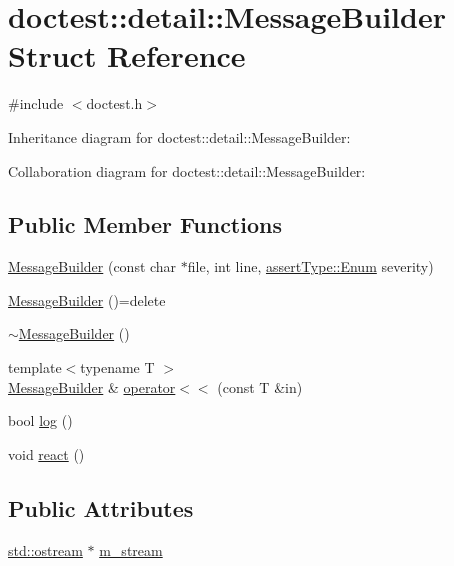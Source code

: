 \hypertarget{structdoctest_1_1detail_1_1MessageBuilder}{}\section{doctest\+:\+:detail\+:\+:Message\+Builder Struct Reference}
\label{structdoctest_1_1detail_1_1MessageBuilder}


{\ttfamily \#include $<$doctest.\+h$>$}



Inheritance diagram for doctest\+:\+:detail\+:\+:Message\+Builder\+:


Collaboration diagram for doctest\+:\+:detail\+:\+:Message\+Builder\+:
\subsection*{Public Member Functions}
\begin{DoxyCompactItemize}
\item 
\hyperlink{structdoctest_1_1detail_1_1MessageBuilder_a93cb6f180968d38cb0f18b08ec6c9000}{Message\+Builder} (const char $\ast$file, int line, \hyperlink{namespacedoctest_1_1assertType_ae1bb5bed722f34f1c38b83cb19d326d3}{assert\+Type\+::\+Enum} severity)
\item 
\hyperlink{structdoctest_1_1detail_1_1MessageBuilder_aaaaf33f49c6d66425af9c2306010ae7e}{Message\+Builder} ()=delete
\item 
\hyperlink{structdoctest_1_1detail_1_1MessageBuilder_aa8dca00768780164f52e309276692f96}{$\sim$\+Message\+Builder} ()
\item 
{\footnotesize template$<$typename T $>$ }\\\hyperlink{structdoctest_1_1detail_1_1MessageBuilder}{Message\+Builder} \& \hyperlink{structdoctest_1_1detail_1_1MessageBuilder_ab9059f961c58179c998c89fc221ec804}{operator$<$$<$} (const T \&in)
\item 
bool \hyperlink{structdoctest_1_1detail_1_1MessageBuilder_a9bcc5d56e1764a7e07efebca55e43cce}{log} ()
\item 
void \hyperlink{structdoctest_1_1detail_1_1MessageBuilder_a3a65c5e39a0c04ae8e2a7c34997a2e4d}{react} ()
\end{DoxyCompactItemize}
\subsection*{Public Attributes}
\begin{DoxyCompactItemize}
\item 
\hyperlink{doctest_8h_a116af65cb5e924b33ad9d9ecd7a783f3}{std\+::ostream} $\ast$ \hyperlink{structdoctest_1_1detail_1_1MessageBuilder_a5319d522ba62c91e59ffa7f6982756e5}{m\+\_\+stream}
\end{DoxyCompactItemize}


